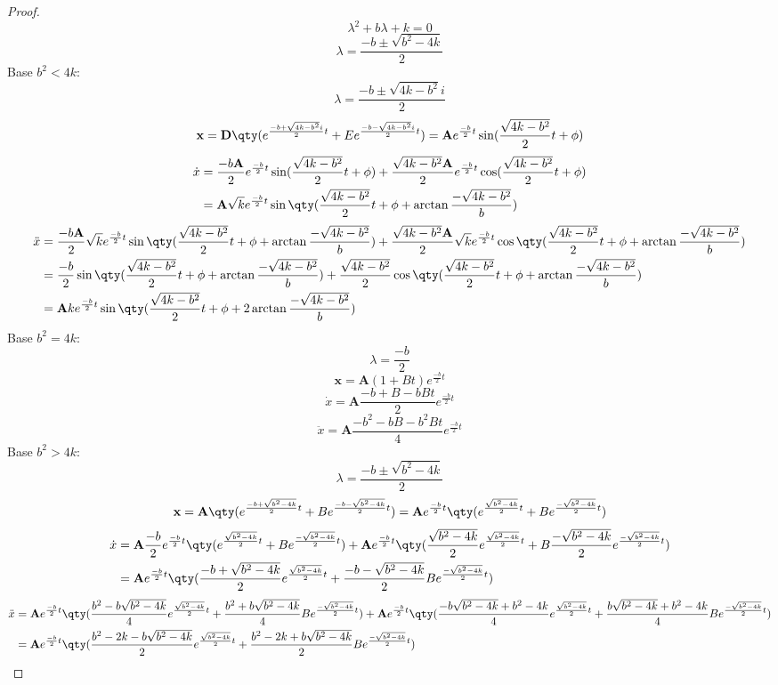\documentclass[a4paper,12pt]{article}
\begin{document}
\begin{proof}
\[\lambda^2+b\lambda+k=0\]
\[\lambda=\frac{-b\pm\sqrt{b^2-4k}}{2}\]
Base $b^2<4k$:
\[\lambda=\frac{-b\pm\sqrt{4k-b^2}i}{2}\]
\[\mathbf{x}=\mathbf{D}\qty(e^{\frac{-b+\sqrt{4k-b^2}i}{2}t}+Ee^{\frac{-b-\sqrt{4k-b^2}i}{2}t})=\mathbf{A}e^{\frac{-b}{2}t}\sin(\frac{\sqrt{4k-b^2}}{2}t+\phi)\]
\[\begin{aligned}
\dot{x}&=\frac{-b\mathbf{A}}{2}e^{\frac{-b}{2}t}\sin(\frac{\sqrt{4k-b^2}}{2}t+\phi)+\frac{\sqrt{4k-b^2}\mathbf{A}}{2}e^{\frac{-b}{2}t}\cos(\frac{\sqrt{4k-b^2}}{2}t+\phi)\\
&=\mathbf{A}\sqrt{k}e^{\frac{-b}{2}t}\sin\qty(\frac{\sqrt{4k-b^2}}{2}t+\phi+\arctan\frac{-\sqrt{4k-b^2}}{b})
\end{aligned}\]
\[\begin{aligned}
\ddot{x}&=\frac{-b\mathbf{A}}{2}\sqrt{k}e^{\frac{-b}{2}t}\sin\qty(\frac{\sqrt{4k-b^2}}{2}t+\phi+\arctan\frac{-\sqrt{4k-b^2}}{b})+\frac{\sqrt{4k-b^2}\mathbf{A}}{2}\sqrt{k}e^{\frac{-b}{2}t}\cos\qty(\frac{\sqrt{4k-b^2}}{2}t+\phi+\arctan\frac{-\sqrt{4k-b^2}}{b})\\
&=\frac{-b}{2}\sin\qty(\frac{\sqrt{4k-b^2}}{2}t+\phi+\arctan\frac{-\sqrt{4k-b^2}}{b})+\frac{\sqrt{4k-b^2}}{2}\cos\qty(\frac{\sqrt{4k-b^2}}{2}t+\phi+\arctan\frac{-\sqrt{4k-b^2}}{b})\\
&=\mathbf{A}ke^{\frac{-b}{2}t}\sin\qty(\frac{\sqrt{4k-b^2}}{2}t+\phi+2\arctan\frac{-\sqrt{4k-b^2}}{b})
\end{aligned}\]
Base $b^2=4k$:
\[\lambda=\frac{-b}{2}\]
\[\mathbf{x}=\mathbf{A}(1+Bt)e^{\frac{-b}{2}t}\]
\[\dot{x}=\mathbf{A}\frac{-b+B-bBt}{2}e^{\frac{-b}{2}t}\]
\[\ddot{x}=\mathbf{A}\frac{-b^2-bB-b^2Bt}{4}e^{\frac{-b}{2}t}\]
Base $b^2>4k$:
\[\lambda=\frac{-b\pm\sqrt{b^2-4k}}{2}\]
\[\mathbf{x}=\mathbf{A}\qty(e^{\frac{-b+\sqrt{b^2-4k}}{2}t}+Be^{\frac{-b-\sqrt{b^2-4k}}{2}t})=\mathbf{A}e^{\frac{-b}{2}t}\qty(e^{\frac{\sqrt{b^2-4k}}{2}t}+Be^{\frac{-\sqrt{b^2-4k}}{2}t})\]
\[\begin{aligned}
\dot{x}&=\mathbf{A}\frac{-b}{2}e^{\frac{-b}{2}t}\qty(e^{\frac{\sqrt{b^2-4k}}{2}t}+Be^{\frac{-\sqrt{b^2-4k}}{2}t})+\mathbf{A}e^{\frac{-b}{2}t}\qty(\frac{\sqrt{b^2-4k}}{2}e^{\frac{\sqrt{b^2-4k}}{2}t}+B\frac{-\sqrt{b^2-4k}}{2}e^{\frac{-\sqrt{b^2-4k}}{2}t})\\
&=\mathbf{A}e^{\frac{-b}{2}t}\qty(\frac{-b+\sqrt{b^2-4k}}{2}e^{\frac{\sqrt{b^2-4k}}{2}t}+\frac{-b-\sqrt{b^2-4k}}{2}Be^{\frac{-\sqrt{b^2-4k}}{2}t})
\end{aligned}\]
\[\begin{aligned}
\ddot{x}&=\mathbf{A}e^{\frac{-b}{2}t}\qty(\frac{b^2-b\sqrt{b^2-4k}}{4}e^{\frac{\sqrt{b^2-4k}}{2}t}+\frac{b^2+b\sqrt{b^2-4k}}{4}Be^{\frac{-\sqrt{b^2-4k}}{2}t})+\mathbf{A}e^{\frac{-b}{2}t}\qty(\frac{-b\sqrt{b^2-4k}+b^2-4k}{4}e^{\frac{\sqrt{b^2-4k}}{2}t}+\frac{b\sqrt{b^2-4k}+b^2-4k}{4}Be^{\frac{-\sqrt{b^2-4k}}{2}t})\\
&=\mathbf{A}e^{\frac{-b}{2}t}\qty(\frac{b^2-2k-b\sqrt{b^2-4k}}{2}e^{\frac{\sqrt{b^2-4k}}{2}t}+\frac{b^2-2k+b\sqrt{b^2-4k}}{2}Be^{\frac{-\sqrt{b^2-4k}}{2}t})
\end{aligned}\]
\end{proof}
\end{document}
